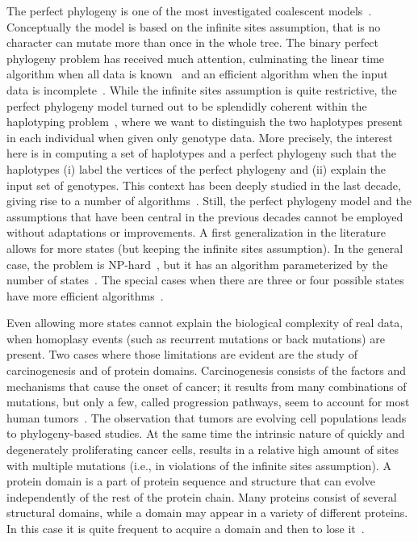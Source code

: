 The perfect phylogeny is one of the most investigated coalescent models~\cite{Gusfield}.
Conceptually the  model is based on the infinite sites assumption, that is no
character can mutate more than once in the whole tree.
The binary perfect phylogeny problem has received much attention, culminating
the linear time algorithm when all data is known~\cite{Gus91} and an efficient
algorithm when the input data is incomplete~\cite{Sha}.
While the infinite sites assumption is quite restrictive, the perfect phylogeny model
turned out to be splendidly coherent within the haplotyping problem~\cite{bo4,Gus02}, where we want to distinguish the two
haplotypes present in each individual when given only genotype data.
More precisely, the interest here is in computing a set of haplotypes and a perfect phylogeny such that the haplotypes
(i) label the vertices of the perfect phylogeny and (ii) explain the input set of genotypes.
This context has been deeply studied in the last decade, giving rise to a number of   algorithms~\cite{Boniz,Gus06}.
%
Still, the perfect phylogeny model and the assumptions that have been central in
the previous decades cannot be employed without adaptations or improvements.
A first generalization in the literature allows for more states
(but keeping the infinite sites assumption).
In the general case, the problem is NP-hard~\cite{BFW92}, but it has
an algorithm parameterized by the number of
states~\cite{DBLP:journals/siamcomp/Fernandez-BacaL03,kannan1997fast}.
The special cases when there are three or four possible states have more
efficient algorithms~\cite{dress1992convex,kannan1994inferring,gysel2012constructing}.


Even allowing more states cannot explain the biological complexity of
real data, when homoplasy events (such as recurrent mutations or back
mutations) are present.
Two cases where those limitations are evident are the study of carcinogenesis
and of protein domains.
Carcinogenesis consists of the factors
and mechanisms that cause the onset of cancer; it
results from many combinations of mutations, but only a few, called progression
pathways, seem to account for most human tumors~\cite{subramanian2012inference}.
The observation that tumors are evolving cell populations leads to phylogeny-based
studies. At the same time the intrinsic nature of quickly and degenerately
proliferating cancer cells, results in a relative high amount of sites with
multiple mutations (i.e., in violations of the infinite sites assumption).
A protein domain is
a part of protein sequence and structure that can evolve independently of the
rest of the protein chain. Many proteins consist of several structural
domains, while a domain may appear in a variety of different proteins. In this case
it is quite frequent to acquire a domain and then to lose it~\cite{przytycka2006graph}.

